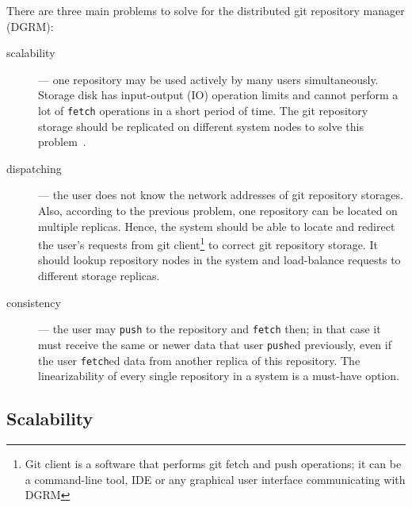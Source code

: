 \documentclass[acmlarge, screen, nonacm, 11pt]{acmart}
\newcommand{\code}[1]{\texttt{#1}}
\begin{document}
There are three main problems to solve for the distributed git repository manager (DGRM):
\begin{description}
\item[scalability] --- one repository may be used actively by many users simultaneously. Storage disk
  has input-output (IO) operation limits and cannot perform a lot of \code{fetch} operations in
  a short period of time. The git repository storage should be replicated on different system nodes to
  solve this problem~\cite{scalability}.
\item[dispatching] --- the user does not know the network addresses of git repository storages. Also, according to the
  previous problem, one repository can be located on multiple replicas.
  Hence, the system should be able to locate and redirect the user's requests
  from git client\footnote{Git client is a software that performs git fetch and push operations; it can be
  a command-line tool, IDE or any graphical user interface communicating with DGRM} to correct git repository
  storage. It should lookup repository nodes in the system and load-balance requests to different storage replicas.
\item[consistency] --- the user may \code{push} to the repository and \code{fetch} then; in that case it must receive
  the same or newer data that user \code{push}ed previously, even if the user \code{fetch}ed data from another
  replica of this repository. The linearizability of every single repository in a system is a must-have option.
\end{description}

\subsection{Scalability}\label{sec:scalability}
\end{document}
